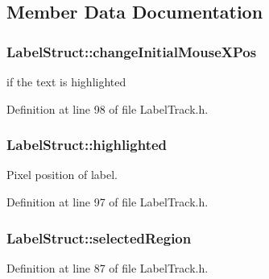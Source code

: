 \subsection{Member Data Documentation}
\subsubsection[{\texorpdfstring{change\+Initial\+Mouse\+X\+Pos}{changeInitialMouseXPos}}]{ Label\+Struct\+::change\+Initial\+Mouse\+X\+Pos}\hypertarget{class_label_struct_a90f50bd9dc6af6bb11ef999c42b1b85d}{}\label{class_label_struct_a90f50bd9dc6af6bb11ef999c42b1b85d}


if the text is highlighted 



Definition at line 98 of file Label\+Track.\+h.

\subsubsection[{\texorpdfstring{highlighted}{highlighted}}]{ Label\+Struct\+::highlighted}\hypertarget{class_label_struct_a5aa066c2c41f9a807171804bb1ed5db8}{}\label{class_label_struct_a5aa066c2c41f9a807171804bb1ed5db8}


Pixel position of label. 



Definition at line 97 of file Label\+Track.\+h.

\subsubsection[{\texorpdfstring{selected\+Region}{selectedRegion}}]{ Label\+Struct\+::selected\+Region}\hypertarget{class_label_struct_ac7eaaf8a91c7f42d33fd0d4d4d8cf56c}{}\label{class_label_struct_ac7eaaf8a91c7f42d33fd0d4d4d8cf56c}


Definition at line 87 of file Label\+Track.\+h.

